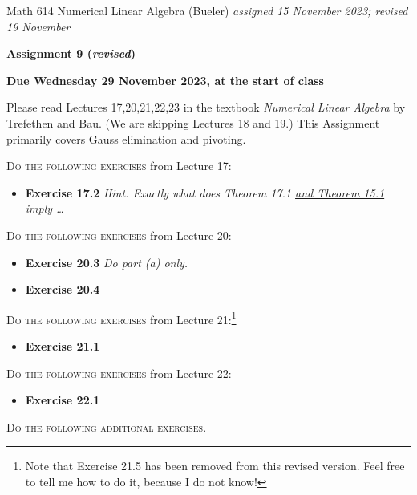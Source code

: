 \documentclass[12pt]{amsart}
\begin{document}
\scriptsize \noindent Math 614 Numerical Linear Algebra (Bueler) \hfill \emph{assigned 15 November 2023; revised 19 November}
\normalsize\medskip

\Large\centerline{\textbf{Assignment 9 \quad (\emph{revised})}}
\large
\medskip

\centerline{\textbf{Due Wednesday 29 November 2023, at the start of class}}
\medskip
\normalsize

\thispagestyle{empty}

\bigskip
\noindent Please read Lectures 17,20,21,22,23 in the textbook \emph{Numerical Linear Algebra} by Trefethen and Bau.  (We are skipping Lectures 18 and 19.)  This Assignment primarily covers Gauss elimination and pivoting.

\bigskip
\noindent \textsc{Do the following exercises} from Lecture 17:

\begin{itemize}
\item \textbf{Exercise 17.2} \quad \emph{Hint.  Exactly what does Theorem 17.1 \underline{and Theorem  15.1} imply \dots}
\end{itemize}

\bigskip
\noindent \textsc{Do the following exercises} from Lecture 20:

\begin{itemize}
\item \textbf{Exercise 20.3} \quad \emph{Do part \emph{(a)} only.}
\item \textbf{Exercise 20.4}
\end{itemize}

\bigskip
\noindent \textsc{Do the following exercises} from Lecture 21:\footnote{Note that Exercise 21.5 has been removed from this revised version.  Feel free to tell me how to do it, because I do not know!}

\begin{itemize}
\item \textbf{Exercise 21.1}
\end{itemize}

\bigskip
\noindent \textsc{Do the following exercises} from Lecture 22:

\begin{itemize}
\item \textbf{Exercise 22.1}
\end{itemize}


\bigskip
\noindent \textsc{Do the following additional exercises.}

\medskip
\end{document}
